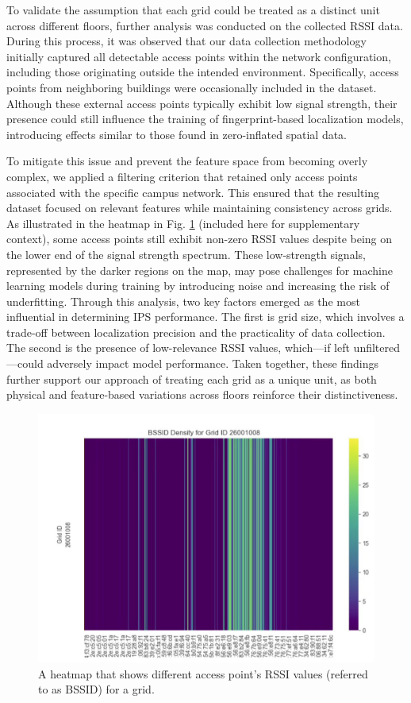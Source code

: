 \documentclass[runningheads]{llncs}
\begin{document}
To validate the assumption that each grid could be treated as a distinct unit across different floors, further analysis was conducted on the collected RSSI data. During this process, it was observed that our data collection methodology initially captured all detectable access points within the network configuration, including those originating outside the intended environment. Specifically, access points from neighboring buildings were occasionally included in the dataset. Although these external access points typically exhibit low signal strength, their presence could still influence the training of fingerprint-based localization models, introducing effects similar to those found in zero-inflated spatial data.

To mitigate this issue and prevent the feature space from becoming overly complex, we applied a filtering criterion that retained only access points associated with the specific campus network. This ensured that the resulting dataset focused on relevant features while maintaining consistency across grids.
As illustrated in the heatmap in Fig. \ref{fig:heatmap008} (included here for supplementary context), some access points still exhibit non-zero RSSI values despite being on the lower end of the signal strength spectrum. These low-strength signals, represented by the darker regions on the map, may pose challenges for machine learning models during training by introducing noise and increasing the risk of underfitting.
Through this analysis, two key factors emerged as the most influential in determining IPS performance. The first is grid size, which involves a trade-off between localization precision and the practicality of data collection. The second is the presence of low-relevance RSSI values, which—if left unfiltered—could adversely impact model performance. Taken together, these findings further support our approach of treating each grid as a unique unit, as both physical and feature-based variations across floors reinforce their distinctiveness.

\begin{figure}[htbp]
	\centerline{\includegraphics[scale=0.15]{meth3.jpg}}
	\caption{A heatmap that shows different access point’s RSSI values (referred to as BSSID) for a grid.}
	\label{fig:heatmap008}
\end{figure}
\end{document}
